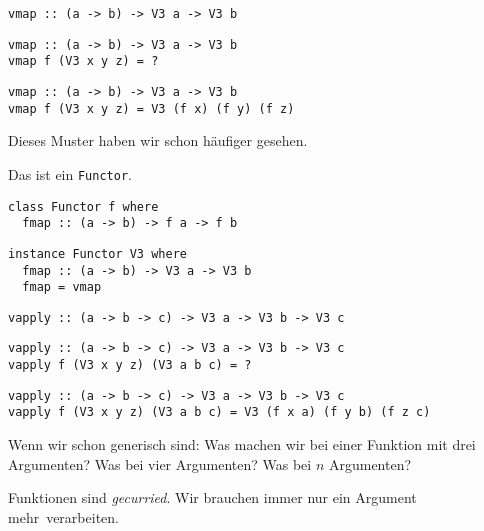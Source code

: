 \documentclass{beamer}
\begin{document}
\begin{frame}[fragile]
\begin{overprint}
\begin{verbatim}
vmap :: (a -> b) -> V3 a -> V3 b
\end{verbatim}
\begin{verbatim}
vmap :: (a -> b) -> V3 a -> V3 b
vmap f (V3 x y z) = ?
\end{verbatim}
\begin{verbatim}
vmap :: (a -> b) -> V3 a -> V3 b
vmap f (V3 x y z) = V3 (f x) (f y) (f z)
\end{verbatim}
\end{overprint}
\pause
\pause
\pause
\bigskip

Dieses Muster haben wir schon häufiger gesehen.\\\par
\pause
Das ist ein \texttt{Functor}.
\begin{verbatim}
class Functor f where
  fmap :: (a -> b) -> f a -> f b
\end{verbatim}
\pause
\begin{verbatim}
instance Functor V3 where
  fmap :: (a -> b) -> V3 a -> V3 b
  fmap = vmap
\end{verbatim}

\end{frame}

\begin{frame}[fragile]
\begin{overprint}
\begin{verbatim}
vapply :: (a -> b -> c) -> V3 a -> V3 b -> V3 c
\end{verbatim}
\begin{verbatim}
vapply :: (a -> b -> c) -> V3 a -> V3 b -> V3 c
vapply f (V3 x y z) (V3 a b c) = ?
\end{verbatim}
\begin{verbatim}
vapply :: (a -> b -> c) -> V3 a -> V3 b -> V3 c
vapply f (V3 x y z) (V3 a b c) = V3 (f x a) (f y b) (f z c)
\end{verbatim}
\end{overprint}
\pause
\pause
\pause
\bigskip

Wenn wir schon generisch sind:
Was machen wir bei einer Funktion mit drei Argumenten? \pause
Was bei vier Argumenten? \pause
Was bei $n$ Argumenten? \pause\bigskip
 
Funktionen sind \emph{gecurried}. Wir brauchen immer nur \glqq ein Argument mehr\grqq \ verarbeiten.
\end{frame}
\end{document}
